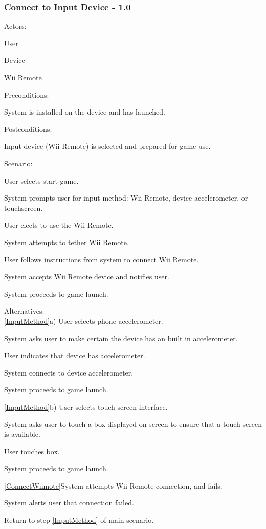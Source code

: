 \documentclass[12pt]{article}
\newenvironment{itemize*}%
  {\begin{itemize}%
  	\setlength{\parsep}{0pt}
    \setlength{\itemsep}{0pt}%
    \setlength{\parskip}{0pt}}%
  {\end{itemize}}
\newenvironment{enumerate*}%
  {\begin{enumerate}%
  	\setlength{\parsep}{0pt}
    \setlength{\itemsep}{0pt}%
    \setlength{\parskip}{0pt}}%
  {\end{enumerate}}
\begin{document}
\subsubsection*{Connect to Input Device - 1.0}
Actors:
\begin{itemize*}
\item User
\item Device 
\item Wii Remote
\end{itemize*}
Preconditions:
\begin{itemize*}
\item System is installed on the device and has launched.
\end{itemize*}
Postconditions:
\begin{itemize*}
\item Input device (Wii Remote) is selected and prepared for game use.
\end{itemize*}
Scenario:
\begin{enumerate*}
\item \label{BeginGame}User selects start game.
\item \label{InputMethod}System prompts user for input method: Wii Remote, device accelerometer, or touchscreen.
\item User elects to use the Wii Remote.
\item \label{ConnectWiimote}System attempts to tether Wii Remote.
\item User follows instructions from system to connect Wii Remote.
\item System accepts Wii Remote device and notifies user.
\item System proceeds to game launch.
\end{enumerate*}
Alternatives:\\
\ref{InputMethod}a) User selects phone accelerometer.  
\begin{enumerate*}
\item System asks user to make certain the device has an built in accelerometer.
\item User indicates that device has accelerometer.
\item System connects to device accelerometer.
\item System proceeds to game launch.
\end{enumerate*}
\ref{InputMethod}b) User selects touch screen interface.
\begin{enumerate*}
\item System asks user to touch a box displayed on-screen to ensure that a touch screen is available.
\item User touches box.
\item System proceeds to game launch.
\end{enumerate*}
\ref{ConnectWiimote}System attempts Wii Remote connection, and fails.
\begin{enumerate*}
\item System alerts user that connection failed.
\item Return to step \ref{InputMethod} of main scenario.
\end{enumerate*}
\end{document}
